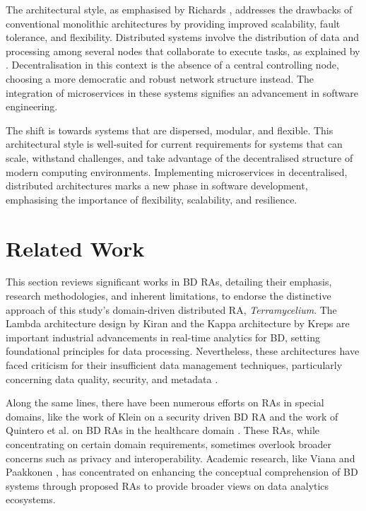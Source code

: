 \documentclass{ieeeaccess}
\begin{document}
The architectural style, as emphasised by Richards \cite{richardson2018microservices}, addresses the drawbacks of conventional monolithic architectures by providing improved scalability, fault tolerance, and flexibility. Distributed systems involve the distribution of data and processing among several nodes that collaborate to execute tasks, as explained by \cite{Coulouris2005}. Decentralisation in this context is the absence of a central controlling node, choosing a more democratic and robust network structure instead. The integration of microservices in these systems signifies an advancement in software engineering. 

The shift is towards systems that are dispersed, modular, and flexible. This architectural style is well-suited for current requirements for systems that can scale, withstand challenges, and take advantage of the decentralised structure of modern computing environments. Implementing microservices in decentralised, distributed architectures marks a new phase in software development, emphasising the importance of flexibility, scalability, and resilience.

\section{Related Work}

\label{sec:related_work}

This section reviews significant works in BD RAs, detailing their emphasis, research methodologies, and inherent limitations, to endorse the distinctive approach of this study's domain-driven distributed RA, \textit{Terramycelium}. The Lambda architecture design by Kiran \cite{kiran2015lambda} and the Kappa architecture by Kreps \cite{kreps2014} are important industrial advancements in real-time analytics for BD, setting foundational principles for data processing. Nevertheless, these architectures have faced criticism for their insufficient data management techniques, particularly concerning data quality, security, and metadata \cite{AtaeiACIS}. 

Along the same lines, there have been numerous efforts on RAs in special domains, like the work of Klein on a security driven BD RA \cite{klein2016reference} and the work of Quintero et al. on BD RAs in the healthcare domain \cite{quintero2019ibm}. These RAs, while concentrating on certain domain requirements, sometimes overlook broader concerns such as privacy and interoperability. Academic research, like Viana \cite{viana2014proposal} and Paakkonen \cite{paakkonen2015reference}, has concentrated on enhancing the conceptual comprehension of BD systems through proposed RAs to provide broader views on data analytics ecosystems. 
\end{document}

